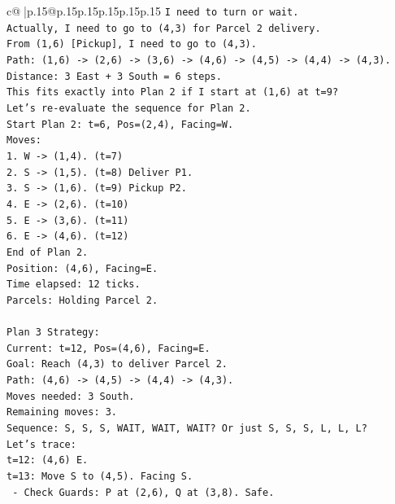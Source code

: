\documentclass{article}
\begin{document}
{\begin{supertabular}{c@{$\;$}|p{.15\linewidth}@{}p{.15\linewidth}p{.15\linewidth}p{.15\linewidth}p{.15\linewidth}p{.15\linewidth}}
{{{\texttt{I need to turn or wait.} \\
\texttt{Actually, I need to go to (4,3) for Parcel 2 delivery.} \\
\texttt{From (1,6) {[}Pickup{]}, I need to go to (4,3).} \\
\texttt{Path: (1,6) {-}> (2,6) {-}> (3,6) {-}> (4,6) {-}> (4,5) {-}> (4,4) {-}> (4,3).} \\
\texttt{Distance: 3 East + 3 South = 6 steps.} \\
\texttt{This fits exactly into Plan 2 if I start at (1,6) at t=9?} \\
\texttt{Let's re{-}evaluate the sequence for Plan 2.} \\
\texttt{Start Plan 2: t=6, Pos=(2,4), Facing=W.} \\
\texttt{Moves:} \\
\texttt{1. W {-}> (1,4). (t=7)} \\
\texttt{2. S {-}> (1,5). (t=8) Deliver P1.} \\
\texttt{3. S {-}> (1,6). (t=9) Pickup P2.} \\
\texttt{4. E {-}> (2,6). (t=10)} \\
\texttt{5. E {-}> (3,6). (t=11)} \\
\texttt{6. E {-}> (4,6). (t=12)} \\
\texttt{End of Plan 2.} \\
\texttt{Position: (4,6), Facing=E.} \\
\texttt{Time elapsed: 12 ticks.} \\
\texttt{Parcels: Holding Parcel 2.} \\
\\ 
\texttt{Plan 3 Strategy:} \\
\texttt{Current: t=12, Pos=(4,6), Facing=E.} \\
\texttt{Goal: Reach (4,3) to deliver Parcel 2.} \\
\texttt{Path: (4,6) {-}> (4,5) {-}> (4,4) {-}> (4,3).} \\
\texttt{Moves needed: 3 South.} \\
\texttt{Remaining moves: 3.} \\
\texttt{Sequence: S, S, S, WAIT, WAIT, WAIT? Or just S, S, S, L, L, L?} \\
\texttt{Let's trace:} \\
\texttt{t=12: (4,6) E.} \\
\texttt{t=13: Move S to (4,5). Facing S.} \\
\texttt{   {-} Check Guards: P at (2,6), Q at (3,8). Safe.} \\
}}}
\end{supertabular}}
\end{document}
